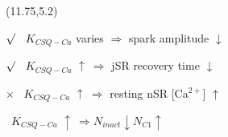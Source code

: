 \documentclass[a0]{a0poster}
\def\Ca{Ca$^{2+}$}
\begin{document}
\begin{textblock}{5.5}(11.75,5.2)


\hspace{2in} {$\surd$} \ $K_{CSQ-Ca}$ varies $\Rightarrow$ spark amplitude $\downarrow$

\vspace{-0.1in} \hspace{2in}  {$\surd$} \  $K_{CSQ-Ca}$ $\uparrow\ \Rightarrow$ jSR recovery time $\downarrow$

\vspace{-0.1in} \hspace{2in} {$\times$} \  $K_{CSQ-Ca}$ $\uparrow\ \Rightarrow$ resting nSR [\Ca] $\uparrow$


\vspace{-0.1in} \hspace{2.35in} \ $K_{CSQ-Ca}$ $\uparrow\ \Rightarrow N_{inact} \downarrow N_{C1} \uparrow$



\end{textblock}
\end{document}
